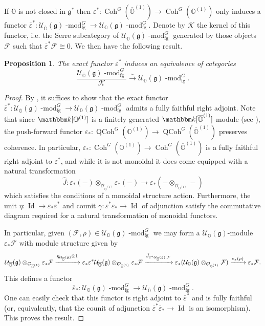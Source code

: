 \documentclass[twoside,12pt,reqno]{amsart}
\newtheorem{Proposition}[Theorem]{Proposition}
\theoremstyle{remark}
\numberwithin{equation}{section}
\def\isoto{\overset{\sim}{\longrightarrow}}
\def\k{{\mathbbm k}}
\def\lmod{\!\operatorname{-mod}}
\def\Id{\operatorname{Id}}
\def\QCoh{\operatorname{QCoh}}
\def\Coh{\operatorname{Coh}}
\def\o{\overline}
\def\O{{\mathbb O}}
\def\cO{{\overline{\mathbb O}}}
\def\g{{\mathfrak g}}
\def\cF{\mathcal{F}}
\def\cK{\mathcal{K}}
\def\U{\mathcal{U}}
\def\Oc{\mathcal{O}}
\newcommand{\fg}{\operatorname{fg}}
\begin{document}
If $\O$ is not closed in $\g^*$ then $\varepsilon^*:\Coh^G(\cO^{(1)})\to \Coh^G(\O^{(1)})$ only induces a functor $\o\varepsilon^*:\U_{\cO}(\g)\lmod^G_{\fg}\to \U_\O(\g)\lmod^G_{\fg}$. Denote by $\cK$ the kernel of this functor, i.e. the Serre subcategory of $\U_{\o \O}(\g)\lmod^G_{\fg}$ generated by those objects $\cF$ such that $\o\varepsilon^*\cF\cong 0$. We then have the following result.

\begin{Proposition}
\label{P:generalequivalencebydescent}
    The exact functor $\varepsilon^*$ induces an equivalence of categories $$\frac{\U_{\o \O}(\g)\lmod^G_{\fg}}{\cK}\isoto \U_\O(\g)\lmod^G_{\fg}.$$
\end{Proposition}
\begin{proof}
    By \cite[Proposition III.2.5]{Ga}, it suffices to show that the exact functor $\o\varepsilon^*:\U_{\cO}(\g)\lmod^G_{\fg}\to \U_\O(\g)\lmod^G_{\fg}$ admits a fully faithful right adjoint. Note that since $\k[\O^{(1)}]$ is a finitely generated $\k[\cO^{(1)}]$-module (see \cite[Proposition 8.3]{JaNO}), the push-forward functor $\varepsilon_*:\QCoh^G(\O^{(1)})\to \QCoh^G(\cO^{(1)})$ preserves coherence. In particular, $\varepsilon_*:\Coh^G(\O^{(1)})\to\Coh^G(\cO^{(1)})$ is a fully faithful right adjoint to $\varepsilon^*$, and while it is not monoidal it does come equipped with a natural transformation $$\hat{J}:\varepsilon_*(-)\otimes_{\Oc_{\cO^{(1)}}}\varepsilon_*(-)\to \varepsilon_*(-\otimes_{\Oc_{\O^{(1)}}}-)$$ which satisfies the conditions of a monoidal structure action. Furthermore, the unit $\eta:\Id\to \varepsilon_*\varepsilon^*$ and counit $\gamma:\varepsilon^*\varepsilon_*\to \Id$ of adjunction satisfy the commutative diagram required for a natural transformation of monoidal functors. 
    
    In particular, given $(\cF,\rho)\in\U_\O(\g)\lmod^G_{\fg}$ we may form a $\U_{\cO}(\g)$-module $\varepsilon_*\cF$ with module structure given by $$\U_\cO(\g)\otimes_{\Oc_{\cO^{(1)}}}\varepsilon_*\cF\xrightarrow{\eta_{\U_{\tiny\cO}(\g)}\otimes 1} \varepsilon_* \varepsilon^* \U_\cO(\g)\otimes_{\Oc_{\cO^{(1)}}}\varepsilon_*\cF \xrightarrow{\hat{J}_{\varepsilon^*\U_{\tiny\cO}(\g),\cF}} \varepsilon_*(\U_\O(\g)\otimes_{\Oc_{\O^{(1)}}}\cF)\xrightarrow{\varepsilon_*(\rho)} \varepsilon_*\cF.$$ This defines a functor $$\o\varepsilon_*:\U_\O(\g)\lmod^G_{\fg}\to \U_\cO(\g)\lmod^G_{\fg}.$$ One can easily check that this functor is right adjoint to $\o\varepsilon^*$ and is fully faithful (or, equivalently, that the counit of adjunction $\o\varepsilon^*\o\varepsilon_*\to \Id$ is an isomorphism). This proves the result.
\end{proof}
\end{document}
